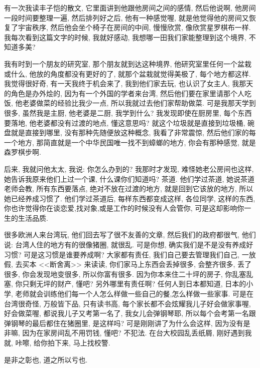 \documentclass[11pt]{article}
\begin{document}
有一次我读丰子恺的散文, 它里面讲到他跟他房间之间的感情, 然后他说啊, 他房间一段时间要整理一遍, 然后排列好之后, 他有一种感觉喔, 就是他觉得他的房间又恢复了宇宙秩序, 然后他会坐个椅子在房间的中间, 慢慢欣赏, 像欣赏星罗棋布一样. 我每次看到这篇文字的时候, 我就好感动, 我想哪一田我们家能整理到这个境界, 不知道多美?  

我有时到一个朋友的研究室, 那个朋友就到达这种境界, 他研究室里任何一个盆栽或什么, 他放的角度都没有更好的了, 就那个盆栽就觉得美极了, 每个地方都这样. 我觉得很好奇, 有一天我终于机会来了, 我到他们家去玩, 也认识了女主人, 我那天的角色是办外烩的, 因为有一个外国的学者来台湾, 然后他们要在家里请那个人吃饭, 他老婆做菜的经验比我少一点, 所以我就过去他们家帮助做菜. 可是我那天学到很多, 虽然我是主厨, 他老婆是二厨, 我学到什么? 我发现即使在厨房里, 每个东西要落地, 他老婆都没有过渡的地点, 懂这意思吗? 就这个垃圾就是直接到垃圾桶, 碗盘就是直接到哪里, 没有那种先随便放这种概念, 我看了非常震惊, 然后他们家的每一个地方, 那简直就是一个中华民国唯一找不到蟑螂的地方, 你会有那种感觉, 就是森罗棋步啊.

后来, 我就问他太太, 我说: 你怎么办到的? 我那时才发现, 难怪她老公房间也这样, 她告诉我原来他们上过一个课, 什么课你们知道吗? 茶道. 他们学过茶道, 她说茶道老师会教, 所有东西要落点, 绝对不放在过渡的地方, 就是回到它该放的地方, 所以她已经养成习惯了. 他们学过茶道后, 每样东西都变成这样, 各位同学, 这样的东西, 你也许觉得你在谈恋爱,找对象,或是工作的时候没有人会管你, 可是这却影响你一生的生活品质. 

很多欧洲人来台湾玩, 他们回去写了很不友善的文章, 然后我们的政府都很气, 他们说: 台湾人住的地方有的很像猪圈, 就很乱. 可是你想, 确实我们是不是没有养成好习惯? 可是这习惯是谁要养成啊? 大家都有责任, 我们自己要去管理我们自己, 一放假, 去买本 <<断舍离>> 来读读, 你们家马上东西会丢掉很多, 会整齐很多, 丢了很多, 你会发现地变很多, 所以你富有很多. 因为你本来住二十坪的房子, 你乱塞乱塞, 你只剩无坪的财产, 懂吧? 另外哪里有责任啊? 任何人到日本都知道, 日本的小学, 老师就会训练他们每一个人怎么样做一些自己的餐,怎么样做一些家事. 可是在台湾很奇怪, 万般皆下品, 只有读书高, 每个家长都不会炫耀我儿子好会做家事喔,好会做菜喔, 都说我儿子又考第一名了, 我女儿会弹钢琴耶, 所以每个会考第一名跟弹钢琴的最后都住在猪圈里, 是这样吗? 可是刚刚讲了为什么会这样, 因为没有是非嘛, 因为在家房间乱不用罚钱, 懂吧? 不犯法. 在台大校园乱丢纸屑, 刚好遇到我就, 咔嚓, 给你拍下来, 马上找校警.

\begin{center}
	{\color{magenta} 是非之彰也, 道之所以亏也.}	
\end{center}

\vspace{-0.5cm}
\end{document}
